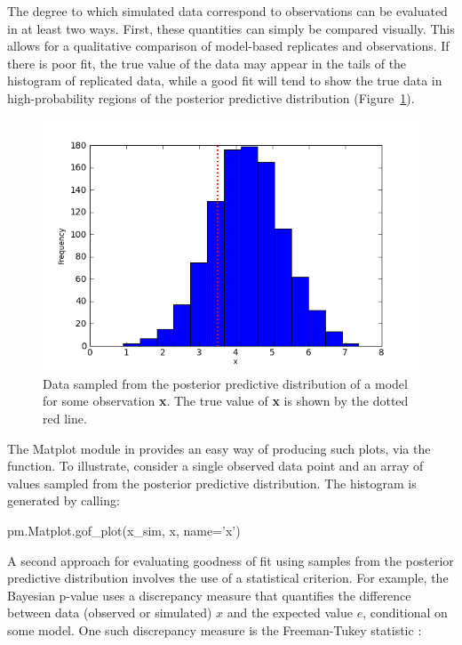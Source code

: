 \documentclass[]{jss}
\begin{document}
The degree to which simulated data correspond to observations can be evaluated in at least two ways. First, these quantities can simply be compared visually. This allows for a qualitative comparison of model-based replicates and observations. If there is poor fit, the true value of the data may appear in the tails of the histogram of replicated data, while a good fit will tend to show the true data in high-probability regions of the posterior predictive distribution (Figure~\ref{fig:gof}).

\begin{figure}[htdevi!]
        \begin{center}
        \includegraphics[width=15cm]{gof.png}
    \end{center}
    \caption{Data sampled from the posterior predictive distribution of a model for some observation \textbf{x}. The true value of \textbf{x} is shown by the dotted red line.}
    \label{fig:gof}
\end{figure}

The Matplot module in  provides an easy way of producing such plots, via the  function. To illustrate, consider a single observed data point  and an array of values  sampled from the posterior predictive distribution. The histogram is generated by calling:

\begin{CodeInput}
pm.Matplot.gof_plot(x_sim, x, name='x')
\end{CodeInput}

A second approach for evaluating goodness of fit using samples from the posterior predictive distribution involves the use of a statistical criterion. For example, the Bayesian p-value \citep{Gelman:1996gp} uses a discrepancy measure that quantifies the difference between data (observed or simulated) $x$ and the expected value $e$, conditional on some model. One such discrepancy measure is the Freeman-Tukey statistic \citep{Brooks:2000il}:
\end{document}
